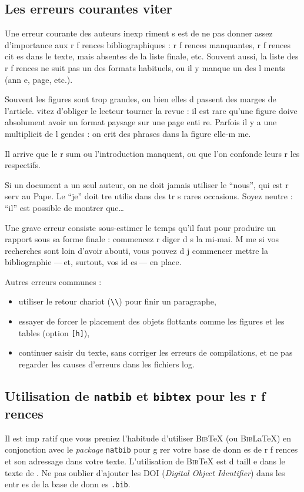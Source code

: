 \documentclass{article}
\begin{document}
\subsection{Les erreurs courantes     viter}

Une erreur courante des auteurs inexp riment s est de ne pas donner assez
 d'importance aux r f rences bibliographiques : r f rences manquantes, 
r f rences cit es dans le texte, mais absentes de la liste finale, etc. 
Souvent aussi, la liste des r f rences ne suit pas un des formats habituels, 
ou il y manque un des  l ments (ann e, page, etc.).

Souvent les figures sont trop grandes, ou bien elles d passent des marges de 
l'article. 
 vitez d'obliger le lecteur   tourner la revue : il est rare qu'une figure
 doive absolument avoir un format paysage sur une page enti re.
Parfois il y a une multiplicit  de l gendes : on  crit des phrases dans la
 figure elle-m me.      

Il arrive que le r sum  ou l'introduction manquent, ou que l'on confonde 
leurs r les respectifs.     

Si un document a un seul auteur, on ne doit jamais utiliser le ``nous'',  
qui est r serv  au Pape. Le ``je'' doit  tre utilis  dans des tr s 
rares occasions. Soyez neutre : ``il'' est possible de montrer que\dots 

Une grave erreur consiste   sous-estimer le temps qu'il faut pour
 produire un rapport sous sa forme finale : commencez   r diger d s la mi-mai.
M me si vos recherches sont loin d'avoir abouti, vous pouvez d j  commencer
   mettre la bibliographie ---\,et, surtout, vos id es\,--- en place.
 
 
 Autres erreurs communes :
\begin{itemize}
\item utiliser le retour chariot (\verb"\\") pour finir un paragraphe,
\item essayer de forcer le placement des objets flottants comme les figures et les tables (option \verb"[h]"),
\item continuer   saisir du texte, sans corriger les erreurs de compilations, et ne pas regarder les causes d'erreurs dans les fichiers log.
\end{itemize}



\subsection{Utilisation de \texttt{natbib} et \texttt{bibtex} pour les r f rences}
\label{sec:natbib}
Il est imp ratif que vous preniez l'habitude d'utiliser \textsc{Bib}\TeX{} (ou \textsc{Bib}\LaTeX{})
en conjonction avec le \textit{package\/} \texttt{natbib} pour g rer votre
 base de donn es de r f rences et son adressage dans votre texte. L'utilisation de \textsc{Bib}\TeX{} 
est 
 d taill e dans le texte de \cite{moguilny2021introduction}. Ne pas oublier d'ajouter les DOI 
 (\textit{Digital Object Identifier}) dans les entr es de la base de donn es \texttt{.bib}.
\end{document}

